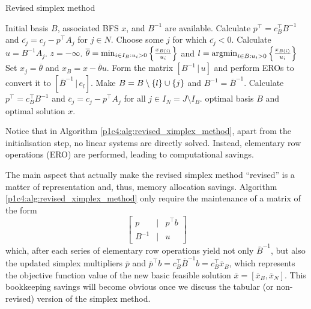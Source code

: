 \begin{algorithm}[h]
	\caption{Revised simplex method} \label{p1c4:alg:revised_ximplex_method}
	\begin{algorithmic}[1] %
	 Initial basis $B$, associated BFS $x$, and $B^{-1}$ are available.
	\State Calculate $p^\top = c_B^\top B^{-1}$ and $\overline{c_j} = c_j - p^\top A_j$ for $j \in N$.
	 \label{p1c4:alg:opt_condition} 
	    \State Choose some $j$ for which $\overline{c_j} < 0$. Calculate $u = B^{-1}A_j$. 
	     \label{p1c4:alg:unb_condition}
			 $z = -\infty$.		
		\Else
			\State $\overline{\theta} = \min_{i \in I_B : u_i > 0} \left\{ \frac{x_{B(i)}}{u_i} \right \}$ and $l = \mathop{\rm argmin}_{i \in B : u_i > 0} \left\{ \frac{x_{B(i)}}{u_i} \right \}$ 
			\State Set $x_j = \overline{\theta}$ and $x_B = x - \overline{\theta}u$.
			\State Form the matrix $[B^{-1} \,|\, u]$ and perform EROs to convert it to $[\overline{B}^{-1} \, | \, e_l]$. 
			\State Make $B = B \setminus \left\{ l \right \} \cup \left\{ j \right \}$ and $B^{-1} = \overline{B}^{-1}$. 
			\State Calculate $p^\top = c_B^\top B^{-1}$ and $\overline{c}_j = c_j - p^\top A_j$ for all $j \in I_N = J \setminus I_B$.
		\EndIf
	\EndWhile
	 optimal basis $B$ and optimal solution $x$.
	\end{algorithmic}
\end{algorithm}

Notice that in Algorithm \ref{p1c4:alg:revised_ximplex_method}, apart from the initialisation step, no linear systems are directly solved. Instead, elementary row operations (ERO) are performed, leading to computational savings.

The main aspect that actually make the revised simplex method ``revised'' is a matter of representation and, thus, memory allocation savings. Algorithm \ref{p1c4:alg:revised_ximplex_method} only require the maintenance of a matrix of the form 
%
\begin{equation*}
	\begin{bmatrix}
		p & | & p^\top b \\
		B^{-1} & | & u	
	\end{bmatrix}
\end{equation*}
%  
which, after each series of elementary row operations yield not only $\overline{B}^{-1}$, but also the updated simplex multipliers $\overline{p}$ and $\overline{p}^\top b = c_B^\top \overline{B}^{-1}b = c_B ^\top \overline{x}_B$, which represents the objective function value of the new basic feasible solution $\overline{x} = [\overline{x}_B, \overline{x}_N]$. This bookkeeping savings will become obvious once we discuss the tabular (or non-revised) version of the simplex method. 

